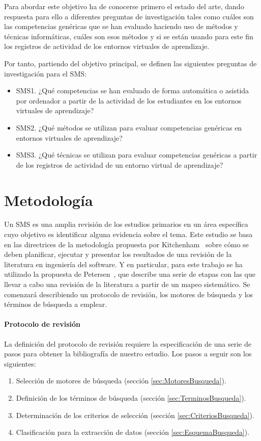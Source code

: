 Para abordar este objetivo ha de conocerse primero el estado del arte, dando respuesta para ello a diferentes preguntas de investigación tales como cuáles son las competencias genéricas que se han evaluado haciendo uso de métodos y técnicas informáticas, cuáles son esos métodos y si se están usando para este fin los registros de actividad de los entornos virtuales de aprendizaje.

\bigskip
Por tanto, partiendo del objetivo principal, se definen las siguientes preguntas de investigación para el SMS:
\begin{itemize}
\item SMS1. ¿Qué competencias se han evaluado de forma automática o asistida por ordenador a partir de la actividad de los estudiantes en los entornos virtuales de aprendizaje?
\item SMS2. ¿Qué métodos se utilizan para evaluar competencias genéricas en entornos virtuales de aprendizaje?
\item SMS3. ¿Qué técnicas se utilizan para evaluar competencias genéricas a partir de los registros de actividad de un entorno virtual de aprendizaje?
\end{itemize}

\section{Metodología}

 Un SMS es una amplia revisión de los estudios primarios en un área específica cuyo objetivo es identificar alguna evidencia sobre el tema. Este estudio se basa en las directrices de la metodología propuesta por Kitchenham~\cite{keele2007guidelines} sobre cómo se deben planificar, ejecutar y presentar los resultados de una revisión de la literatura en ingeniería del software. Y en particular, para este trabajo se ha utilizado la propuesta de Petersen~\cite{Petersen:2008}, que describe una serie de etapas con las que llevar a cabo una revisión de la literatura a partir de un mapeo sistemático. Se comenzará describiendo un protocolo de revisión, los motores de búsqueda y los términos de búsqueda a emplear.

\paragraph*{Protocolo de revisión}
La definición del protocolo de revisión requiere la especificación de una serie de pasos para obtener la bibliografía de nuestro estudio. Los pasos a seguir son los siguientes:
\begin{enumerate}
\item Selección de motores de búsqueda (sección \ref{sec:MotoresBusqueda}).
\item Definición de los términos de búsqueda (sección \ref{sec:TerminosBusqueda}).
\item Determinación de los criterios de selección (sección \ref{sec:CriteriosBusqueda}).
\item Clasificación para la extracción de datos (sección \ref{sec:EsquemaBusqueda}).
\end{enumerate}

